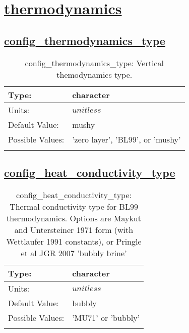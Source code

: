 \section[thermodynamics]{\hyperref[sec:nm_tab_thermodynamics]{thermodynamics}}
\label{sec:nm_sec_thermodynamics}
\subsection[config\_thermodynamics\_type]{\hyperref[sec:nm_tab_thermodynamics]{config\_thermodynamics\_type}}
\label{subsec:nm_sec_config_thermodynamics_type}
\begin{center}
\begin{longtable}{| p{2.0in} || p{4.0in} |}
    \hline
    Type: & character \\
    \hline
    Units: & $unitless$ \\
    \hline
    Default Value: & mushy \\
    \hline
    Possible Values: & 'zero layer', 'BL99', or 'mushy' \\
    \hline
    \caption{config\_thermodynamics\_type: Vertical themodynamics type.}
\end{longtable}
\end{center}
\subsection[config\_heat\_conductivity\_type]{\hyperref[sec:nm_tab_thermodynamics]{config\_heat\_conductivity\_type}}
\label{subsec:nm_sec_config_heat_conductivity_type}
\begin{center}
\begin{longtable}{| p{2.0in} || p{4.0in} |}
    \hline
    Type: & character \\
    \hline
    Units: & $unitless$ \\
    \hline
    Default Value: & bubbly \\
    \hline
    Possible Values: & 'MU71' or 'bubbly' \\
    \hline
    \caption{config\_heat\_conductivity\_type: Thermal conductivity type for BL99 thermodynamics. Options are Maykut and Untersteiner 1971 form (with Wettlaufer 1991 constants), or Pringle et al JGR 2007 'bubbly brine'}
\end{longtable}
\end{center}
